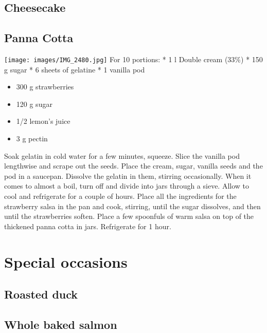 \documentclass[
]{book}
\providecommand{\tightlist}{%
  \setlength{\itemsep}{0pt}\setlength{\parskip}{0pt}}
\begin{document}
\hypertarget{cheesecake}{%
\section{Cheesecake}\label{cheesecake}}

\hypertarget{panna-cotta}{%
\section{Panna Cotta}\label{panna-cotta}}

\texttt{[image: images/IMG\_2480.jpg]}
For 10 portions:
* 1 l Double cream (33\%)
* 150 g sugar
* 6 sheets of gelatine
* 1 vanilla pod

\begin{itemize}
\tightlist
\item
  300 g strawberries
\item
  120 g sugar
\item
  1/2 lemon's juice
\item
  3 g pectin
\end{itemize}

Soak gelatin in cold water for a few minutes, squeeze. Slice the vanilla pod lengthwise and scrape out the seeds.
Place the cream, sugar, vanilla seeds and the pod in a saucepan. Dissolve the gelatin in them, stirring occasionally. When it comes to almost a boil, turn off and divide into jars through a sieve. Allow to cool and refrigerate for a couple of hours.
Place all the ingredients for the strawberry salsa in the pan and cook, stirring, until the sugar dissolves, and then until the strawberries soften. Place a few spoonfuls of warm salsa on top of the thickened panna cotta in jars. Refrigerate for 1 hour.

\hypertarget{special-occasions}{%
\chapter{Special occasions}\label{special-occasions}}

\hypertarget{roasted-duck}{%
\section{Roasted duck}\label{roasted-duck}}

\hypertarget{whole-baked-salmon}{%
\section{Whole baked salmon}\label{whole-baked-salmon}}
\end{document}
